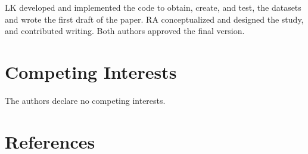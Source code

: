 \documentclass[
  letterpaper,
  DIV=11,
  numbers=noendperiod]{scrartcl}
\begin{document}
LK developed and implemented the code to obtain, create, and test, the
datasets and wrote the first draft of the paper. RA conceptualized and
designed the study, and contributed writing. Both authors approved the
final version.

\hypertarget{competing-interests}{%
\section{Competing Interests}\label{competing-interests}}

The authors declare no competing interests.

\hypertarget{references}{%
\section*{References}\label{references}}
\end{document}
